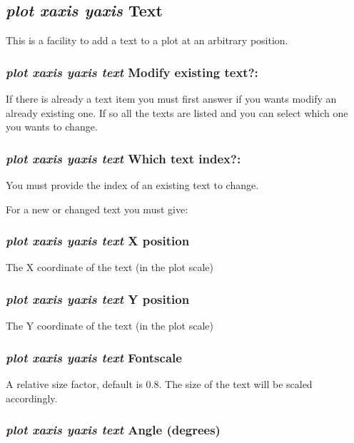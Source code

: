 \documentclass[11pt]{article}
\begin{document}
\hypertarget{Plot texts}{}
\subsection{{\em plot xaxis yaxis} Text}

This is a facility to add a text to a plot at an arbitrary position.

\subsubsection{{\em plot xaxis yaxis text} Modify existing text?:}

If there is already a text item you must first answer if you wants
modify an already existing one.  If so all the texts are listed and
you can select which one you wants to change.

\subsubsection{{\em plot xaxis yaxis text} Which text index?:}

You must provide the index of an existing text to change.

For a new or changed text you must give:

\subsubsection{{\em plot xaxis yaxis text}  X position}

The X coordinate of the text (in the plot scale)

\subsubsection{{\em plot xaxis yaxis text} Y position}

The Y coordinate of the text (in the plot scale)

\subsubsection{{\em plot xaxis yaxis text} Fontscale}

A relative size factor, default is 0.8.  The size of the text will be
scaled accordingly.

\subsubsection{{\em plot xaxis yaxis text} Angle (degrees)}
\end{document}
